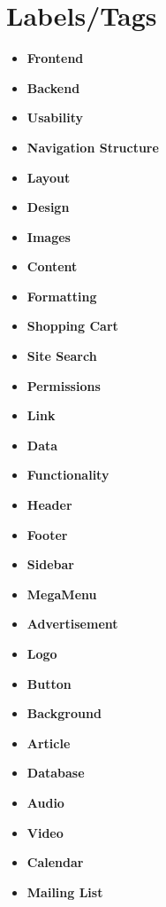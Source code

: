 \documentclass[10pt, oneside, letterpaper]{apa6e}
\begin{document}
\section{Labels/Tags}
\begin{itemize}
    \item \textbf{Frontend}
    \item \textbf{Backend}
    \item \textbf{Usability }
    \item \textbf{Navigation Structure}
    \item \textbf{Layout}
    \item \textbf{Design}
    \item \textbf{Images}
    \item \textbf{Content}
    \item \textbf{Formatting}
    \item \textbf{Shopping Cart}
    \item \textbf{Site Search}
    \item \textbf{Permissions}
    \item \textbf{Link}
    \item \textbf{Data}
    \item \textbf{Functionality}
    \item \textbf{Header}
    \item \textbf{Footer}
    \item \textbf{Sidebar}
    \item \textbf{MegaMenu}
    \item \textbf{Advertisement}
    \item \textbf{Logo}
    \item \textbf{Button}
    \item \textbf{Background}
    \item \textbf{Article}
    \item \textbf{Database}
    \item \textbf{Audio}
    \item \textbf{Video}
    \item \textbf{Calendar}
    \item \textbf{Mailing List}
\end{itemize}
\end{document}

